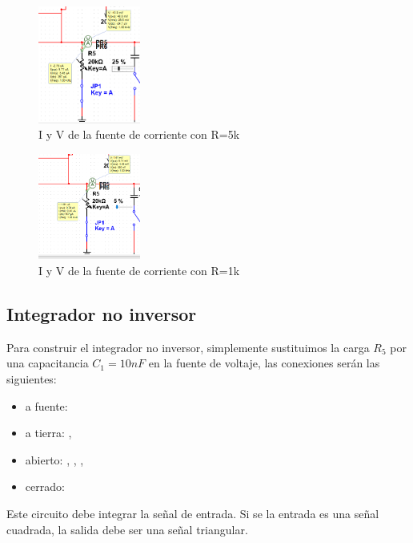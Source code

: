 \begin{figure}[ht]
    \centering
    \includegraphics[width=0.3\textwidth]{src/images/simulaciones/fuente-corriente-mejor-5k.png}
    \caption{I y V de la fuente de corriente con R=5k}
    \label{fig:sim-fuente-corriente-5k}
\end{figure}
\begin{figure}[ht]
    \centering
    \includegraphics[width=0.3\textwidth]{src/images/simulaciones/fuente-corriente-mejor-1k.png}
    \caption{I y V de la fuente de corriente con R=1k}
    \label{fig:sim-fuente-corriente-1k}
\end{figure}


\FloatBarrier
\subsection{Integrador no inversor}

Para construir el integrador no inversor, simplemente sustituimos la carga $R_5$ por una capacitancia $C_1 = 10nF$ en la fuente de voltaje, las conexiones serán las siguientes:

\begin{itemize}
    \item a fuente: 
    \item a tierra: , 
    \item abierto: , , , 
    \item cerrado: 
\end{itemize}

Este circuito debe integrar la señal de entrada. Si se la entrada es una señal cuadrada, la salida debe ser una señal triangular.

